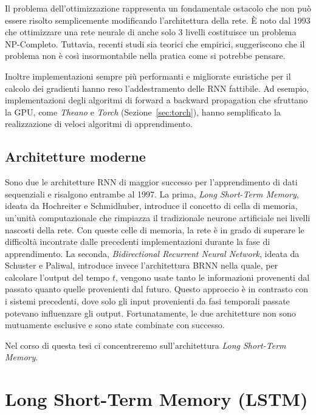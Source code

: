 Il problema dell'ottimizzazione rappresenta un fondamentale ostacolo che non pu\`o
essere risolto semplicemente modificando l'architettura della rete. \`E noto dal
1993 che ottimizzare una rete neurale di anche solo 3 livelli costituisce un
problema NP-Completo. Tuttavia, recenti studi sia teorici che empirici, suggeriscono
che il problema non \`e cos\`i insormontabile nella pratica come si potrebbe pensare.

Inoltre implementazioni sempre pi\`u performanti e migliorate euristiche per il
calcolo dei gradienti hanno reso l'addestramento delle RNN fattibile. Ad esempio,
implementazioni degli algoritmi di forward a backward propagation che sfruttano
la GPU, come \emph{Theano} e \emph{Torch} (Sezione~\ref{sec:torch}), hanno
semplificato la realizzazione di veloci algoritmi di apprendimento.

\subsection{Architetture moderne}

Sono due le architetture RNN di maggior successo per l'apprendimento di dati
sequenziali e risalgono entrambe al 1997. La prima, \emph{Long Short-Term Memory},
ideata da Hochreiter e Schmidhuber, introduce il concetto di cella di memoria,
un'unit\`a computazionale che rimpiazza il tradizionale neurone artificiale nei
livelli nascosti della rete. Con queste celle di memoria, la rete \`e in grado
di superare le difficolt\`a incontrate dalle precedenti implementazioni durante
la fase di apprendimento. La seconda, \emph{Bidirectional Recurrent Neural Network},
ideata da Schuster e Paliwal, introduce invece l'architettura BRNN nella quale,
per calcolare l'output del tempo $t$, vengono usate tanto le informazioni provenenti
dal passato quanto quelle provenienti dal futuro. Questo approccio \`e in contrasto
con i sistemi precedenti, dove solo gli input provenienti da fasi temporali passate
potevano influenzare gli output. Fortunatamente, le due architetture non sono
mutuamente esclusive e sono state combinate con successo.

Nel corso di questa tesi ci concentreremo sull'architettura \emph{Long Short-Term
Memory}.

\section{Long Short-Term Memory (LSTM)}

